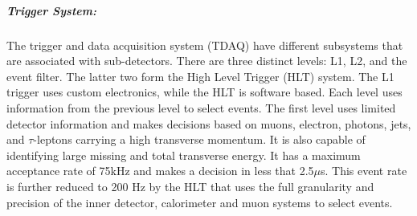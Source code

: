 \subparagraph{Trigger System: }
The trigger and data acquisition system (TDAQ) have different subsystems that are associated with sub-detectors.
There are three distinct levels: L1, L2, and the event filter.
The latter two form the High Level Trigger (HLT) system.
The L1 trigger uses custom electronics, while the HLT is software based.
Each level uses information from the previous level to select events.
%
%
The first level uses limited detector information and makes decisions based on muons, electron, photons, jets, and $\tau$-leptons carrying a high transverse momentum.
It is also capable of identifying large missing and total transverse energy.
 It has a maximum acceptance rate of 75kHz and makes a decision in less that 2.5$\mu$s.
This event rate is further reduced to 200 Hz by the HLT that uses the full granularity and precision of the inner detector, calorimeter and muon systems to select events.



%

